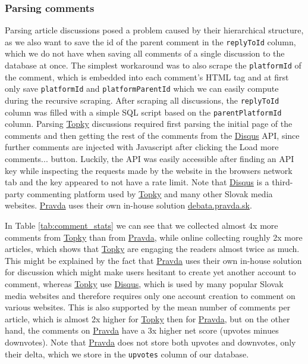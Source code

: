\documentclass[11pt,a4paper]{article}
\def\topky{\href{https://topky.sk}{Topky}}
\def\pravda{\href{https://pravda.sk}{Pravda}}
\def\disqus{\href{https://disqus.com}{Disqus}}
\begin{document}
\subsubsection{Parsing comments}
Parsing article discussions posed a problem caused by their hierarchical structure, as we also want to save the id of the parent comment in the \texttt{replyToId} column, which we do not have when saving all comments of a single discussion to the database at once. The simplest workaround was to also scrape the \texttt{platformId} of the comment, which is embedded into each comment's HTML tag and at first only save \texttt{platformId} and \texttt{platformParentId} which we can easily compute during the recursive scraping. After scraping all discussions, the \texttt{replyToId} column was filled with a simple SQL script based on the \texttt{parentPlatformId} column. Parsing \topky{} discussions required first parsing the initial page of the comments and then getting the rest of the comments from the \disqus{} API, since further comments are injected with Javascript after clicking the Load more comments... button. Luckily, the API was easily accessible after finding an API key while inspecting the requests made by the website in the browsers network tab and the key appeared to not have a rate limit. Note that \disqus{} is a third-party commenting platform used by \topky{} and many other Slovak media websites. \pravda{} uses their own in-house solution \href{https://debata.pravda.sk}{debata.pravda.sk}.

In Table \ref{tab:comment_stats} we can see that we collected almost 4x more comments from \topky{} than from \pravda{}, while online collecting roughly 2x more articles, which shows that \topky{} are engaging the readers almost twice as much. This might be explained by the fact that \pravda{} uses their own in-house solution for discussion which might make users hesitant to create yet another account to comment, whereas \topky{} use \disqus{}, which is used by many popular Slovak media websites and therefore requires only one account creation to comment on various websites. This is also supported by the mean number of comments per article, which is almost 2x higher for \topky{} then for \pravda{}, but on the other hand, the comments on \pravda{} have a 3x higher net score (upvotes minues downvotes). Note that \pravda{} does not store both upvotes and downvotes, only their delta, which we store in the \texttt{upvotes} column of our database.
\end{document}
